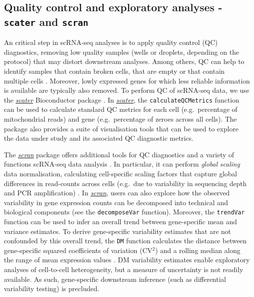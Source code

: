 \documentclass[9pt,a4paper,]{extarticle}
\begin{document}
\hypertarget{quality-control-and-exploratory-analyses---scater-and-scran}{%
\subsection{\texorpdfstring{Quality control and exploratory analyses - \texttt{scater} and \texttt{scran}}{Quality control and exploratory analyses - scater and scran}}\label{quality-control-and-exploratory-analyses---scater-and-scran}}

An critical step in scRNA-seq analyses is to apply quality control (QC)
diagnostics, removing low quality samples (wells or droplets, depending on
the protocol) that may distort downstream analyses.
Among others, QC can help to identify samples that contain broken cells, that
are empty or that contain multiple cells \citep{Ilicic2016classification}.
Moreover, lowly expressed genes for which less reliable information is
available are typically also removed.
To perform QC of scRNA-seq data, we use the \emph{\href{https://bioconductor.org/packages/3.11/scater}{scater}} Bioconductor
package \citep{McCarthy2017}.
In \emph{\href{https://bioconductor.org/packages/3.11/scater}{scater}}, the \texttt{calculateQCMetrics} function can be used to
calculate standard QC metrics for each cell (e.g.~percentage of mitochondrial
reads) and gene (e.g.~percentage of zeroes across all cells).
The package also provides a suite of visualisation tools that can be used to
explore the data under study and its associated QC diagnostic metrics.

The \emph{\href{https://bioconductor.org/packages/3.11/scran}{scran}} package offers additional tools for QC
diagnostics and a variety of functions scRNA-seq data analysis \citep{Lun2016}.
In particular, it can perform \emph{global scaling} data normalisation, calculating
cell-specific scaling factors that capture global differences in read-counts
across cells (e.g.~due to variability in sequencing depth and PCR amplification)
\citep{Lun2016pooling}.
In \emph{\href{https://bioconductor.org/packages/3.11/scran}{scran}}, users can also explore how the observed variability in
gene expression counts can be decomposed into technical and biological
components (see the \texttt{decomposeVar} function).
Moreover, the \texttt{trendVar} function can be used to infer an overall trend between
gene-specific mean and variance estimates.
To derive gene-specific variability estimates that are not confounded by this
overall trend, the \texttt{DM} function calculates the distance between gene-specific
squared coefficients of variation (CV\(^2\)) and a rolling median along the range
of mean expression values \citep{Kolodziejczyk2015cell}.
DM variability estimates enable exploratory analyses of cell-to-cell
heterogeneity, but a measure of uncertainty is not readily available.
As such, gene-specific downstream inference (such as differential variability
testing) is precluded.
\end{document}
